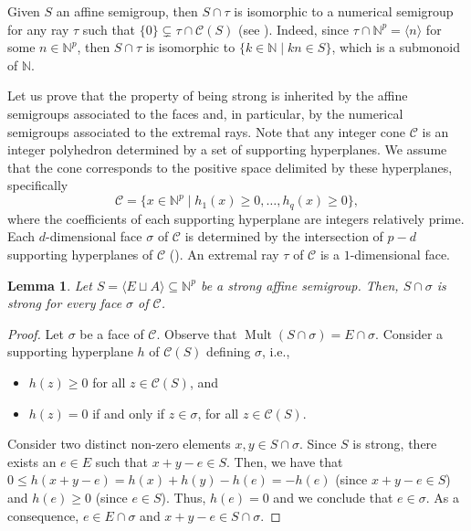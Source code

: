 \documentclass[a4paper,11pt]{article}
\newtheorem{lemma}[theorem]{Lemma}
\def\CaC{\mathcal{C}}
\def\N{\mathbb{N}}
\def\Mult{\operatorname{Mult}}
\begin{document}
{Given $S$ an affine semigroup, then $S\cap \tau$ is isomorphic to a numerical semigroup for any ray $\tau$ such that $\{0\} \subsetneq \tau \cap \CaC(S)$ (see  \cite[Lemma 2]{check_C_semigr}). Indeed, since $\tau\cap\N^p=\langle n \rangle$ for some $ n\in\N^p$, then $S\cap \tau$ is isomorphic to $\{k\in\N\mid kn\in S\}$, which is a submonoid of $\N$.

Let us prove that the property of being strong is inherited by the affine semigroups associated to the faces and, in particular, by the numerical semigroups associated to the extremal rays. Note that any integer cone $\CaC$ is an integer polyhedron determined by a set of supporting hyperplanes. We assume that the cone corresponds to the positive space delimited by these hyperplanes, specifically
\begin{equation}\label{coneHyperplanes}
\CaC=\{x\in \N^p\mid h_1(x)\ge 0,\ldots ,h_q(x)\ge 0\},
\end{equation}
where the coefficients of each supporting hyperplane are integers relatively prime. Each $d$-dimensional face $\sigma$ of $\CaC$ is determined by the intersection of $p-d$ supporting hyperplanes of $\CaC$ (\cite{Bruns}). An extremal ray $\tau$ of $\CaC$ is a $1$-dimensional face.

\begin{lemma}
Let $S=\langle E\sqcup A\rangle\subseteq \N^p$ be a strong affine semigroup. Then, $S \cap \sigma$ is strong for every face $\sigma$ of $\CaC$.
\end{lemma}

\begin{proof} Let $\sigma$ be a face of $\CaC$. Observe that $\Mult(S \cap \sigma) = E \cap \sigma$.
Consider a supporting hyperplane $h$ of $\CaC(S)$ defining $\sigma$, i.e.,
\begin{itemize} \item $h(z) \geq 0$ for all $z \in \CaC(S)$, and
\item  $h(z) = 0$ if and only if $z \in \sigma$, for all $z \in \CaC(S)$.
\end{itemize}
Consider two distinct non-zero elements $x,y\in S \cap \sigma$. Since $S$ is strong, there exists an $e \in E$ such that $x+y-e \in S$. Then, we have that $0 \leq h(x+y-e) = h(x) + h(y) - h(e) = -h(e)$ (since $x+y-e \in S$) and $h(e) \geq 0$ (since $e \in S$). Thus, $h(e) = 0$ and we conclude that $e \in \sigma$. As a consequence, $e \in E \cap \sigma$ and $x+y-e \in S \cap \sigma$.
\end{proof}

}
\end{document}
